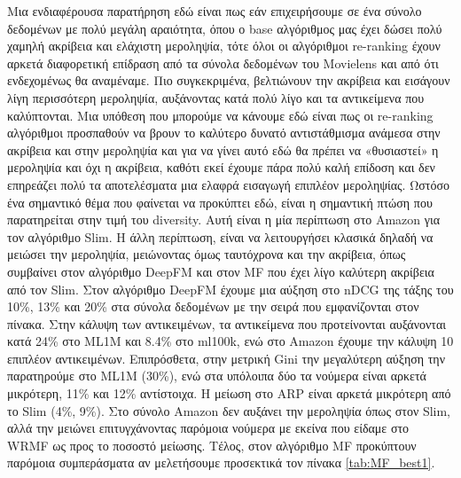 \noindent Μια ενδιαφέρουσα παρατήρηση εδώ είναι πως εάν επιχειρήσουμε σε ένα σύνολο δεδομένων με πολύ μεγάλη αραιότητα, όπου ο base αλγόριθμος μας έχει δώσει πολύ χαμηλή ακρίβεια και ελάχιστη μεροληψία, τότε όλοι οι αλγόριθμοι re-ranking έχουν αρκετά διαφορετική επίδραση από τα σύνολα δεδομένων του Movielens και από ότι ενδεχομένως θα αναμέναμε. Πιο συγκεκριμένα, βελτιώνουν την ακρίβεια και εισάγουν λίγη περισσότερη μεροληψία, αυξάνοντας κατά πολύ λίγο και τα αντικείμενα που καλύπτονται. Μια υπόθεση που μπορούμε να κάνουμε εδώ είναι πως οι re-ranking αλγόριθμοι προσπαθούν να βρουν το καλύτερο δυνατό αντιστάθμισμα ανάμεσα στην ακρίβεια και στην μεροληψία και για να γίνει αυτό εδώ θα πρέπει να «θυσιαστεί» η μεροληψία και όχι η ακρίβεια, καθότι εκεί έχουμε πάρα πολύ καλή επίδοση και δεν επηρεάζει πολύ τα αποτελέσματα μια ελαφρά εισαγωγή επιπλέον μεροληψίας. Ωστόσο ένα σημαντικό θέμα που φαίνεται να προκύπτει εδώ, είναι η σημαντική πτώση που παρατηρείται στην τιμή του diversity. Αυτή είναι η μία περίπτωση στο Amazon για τον αλγόριθμο Slim. Η άλλη περίπτωση, είναι να λειτουργήσει κλασικά δηλαδή να μειώσει την μεροληψία, μειώνοντας όμως ταυτόχρονα και την ακρίβεια, όπως συμβαίνει στον αλγόριθμο DeepFM και στον MF που έχει λίγο καλύτερη ακρίβεια από τον Slim.
\noindent Στον αλγόριθμο DeepFM έχουμε μια αύξηση στο nDCG της τάξης του 10\%, 13\% και 20\% στα σύνολα δεδομένων με την σειρά που εμφανίζονται στον πίνακα. Στην κάλυψη των αντικειμένων, τα αντικείμενα που προτείνονται αυξάνονται κατά 24\% στο ML1M και 8.4\% στο ml100k, ενώ στο Amazon έχουμε την κάλυψη 10 επιπλέον αντικειμένων. Επιπρόσθετα, στην μετρική Gini την μεγαλύτερη αύξηση την παρατηρούμε στο ML1M (30\%), ενώ στα υπόλοιπα δύο τα νούμερα είναι αρκετά μικρότερη, 11\% και 12\% αντίστοιχα. Η μείωση στο ARP είναι αρκετά μικρότερη από το Slim (4\%, 9\%). Στο σύνολο Amazon δεν αυξάνει την μεροληψία όπως στον Slim, αλλά την μειώνει επιτυγχάνοντας παρόμοια νούμερα με εκείνα που είδαμε στο WRMF ως προς το ποσοστό μείωσης.
Τέλος, στον αλγόριθμο MF προκύπτουν παρόμοια συμπεράσματα αν μελετήσουμε προσεκτικά τον πίνακα \ref{tab:MF_best1}.
